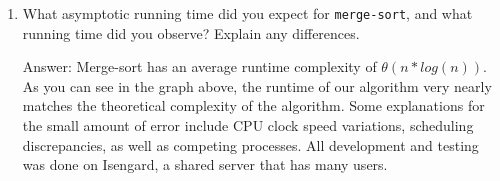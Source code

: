 \documentclass[12pt,letterpaper]{ntdhw}
\begin{document}
\begin{enumerate}
\begin{enumerate}
\begin{emph}
    \end{emph}

    \item What asymptotic running time did you expect for
      \texttt{merge-sort}, and what running time did you observe?
      Explain any differences.

    \begin{emph}
      Answer: %
      Merge-sort has an average runtime complexity of \(\theta (n*log(n))\). As you can see in the graph above, the runtime of our algorithm very nearly matches the theoretical complexity of the algorithm. Some explanations for the small amount of error include CPU clock speed variations, scheduling discrepancies, as well as competing processes. All development and testing was done on Isengard, a shared server that has many users.
    \end{emph}

    \end{enumerate}

\end{enumerate}
\end{document}

